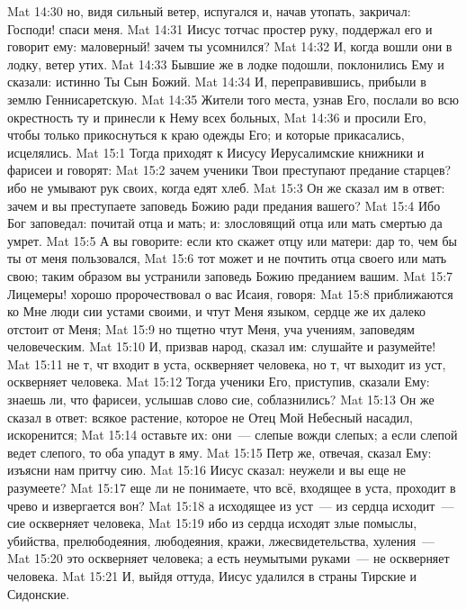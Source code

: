 \vs Mat 14:30 но, видя сильный ветер, испугался и, начав утопать, закричал: Господи! спаси меня.
\vs Mat 14:31 Иисус тотчас простер руку, поддержал его и говорит ему: маловерный! зачем ты усомнился?
\vs Mat 14:32 И, когда вошли они в лодку, ветер утих.
\vs Mat 14:33 Бывшие же в лодке подошли, поклонились Ему и сказали: истинно Ты Сын Божий.
\rsbpar\vs Mat 14:34 И, переправившись, прибыли в землю Геннисаретскую.
\vs Mat 14:35 Жители того места, узнав Его, послали во всю окрестность ту и принесли к Нему всех больных,
\vs Mat 14:36 и просили Его, чтобы только прикоснуться к краю одежды Его; и которые прикасались, исцелялись.
\vs Mat 15:1 Тогда приходят к Иисусу Иерусалимские книжники и фарисеи и говорят:
\vs Mat 15:2 зачем ученики Твои преступают предание старцев? ибо не умывают рук своих, когда едят хлеб.
\vs Mat 15:3 Он же сказал им в ответ: зачем и вы преступаете заповедь Божию ради предания вашего?
\vs Mat 15:4 Ибо Бог заповедал: почитай отца и мать; и: злословящий отца или мать смертью да умрет.
\vs Mat 15:5 А вы говорите: если кто скажет отцу или матери: дар  то, чем бы ты от меня пользовался,
\vs Mat 15:6 тот может и не почтить отца своего или мать свою; таким образом вы устранили заповедь Божию преданием вашим.
\vs Mat 15:7 Лицемеры! хорошо пророчествовал о вас Исаия, говоря:
\vs Mat 15:8 приближаются ко Мне люди сии устами своими, и чтут Меня языком, сердце же их далеко отстоит от Меня;
\vs Mat 15:9 но тщетно чтут Меня, уча учениям, заповедям человеческим.
\vs Mat 15:10 И, призвав народ, сказал им: слушайте и разумейте!
\vs Mat 15:11 не т, чт входит в уста, оскверняет человека, но т, чт выходит из уст, оскверняет человека.
\vs Mat 15:12 Тогда ученики Его, приступив, сказали Ему: знаешь ли, что фарисеи, услышав слово сие, соблазнились?
\vs Mat 15:13 Он же сказал в ответ: всякое растение, которое не Отец Мой Небесный насадил, искоренится;
\vs Mat 15:14 оставьте их: они~--- слепые вожди слепых; а если слепой ведет слепого, то оба упадут в яму.
\vs Mat 15:15 Петр же, отвечая, сказал Ему: изъясни нам притчу сию.
\vs Mat 15:16 Иисус сказал: неужели и вы еще не разумеете?
\vs Mat 15:17 еще ли не понимаете, что всё, входящее в уста, проходит в чрево и извергается вон?
\vs Mat 15:18 а исходящее из уст~--- из сердца исходит~--- сие оскверняет человека,
\vs Mat 15:19 ибо из сердца исходят злые помыслы, убийства, прелюбодеяния, любодеяния, кражи, лжесвидетельства, хуления~---
\vs Mat 15:20 это оскверняет человека; а есть неумытыми руками~--- не оскверняет человека.
\rsbpar\vs Mat 15:21 И, выйдя оттуда, Иисус удалился в страны Тирские и Сидонские.
